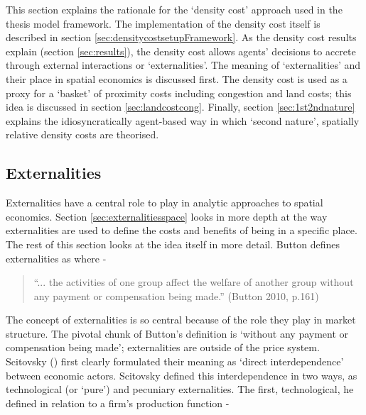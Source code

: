 {This section explains the rationale for the `density cost' approach used in the thesis model framework. The implementation of the density cost itself is described in section \ref{sec:densitycostsetupFramework}. As the density cost results explain (section \ref{sec:results}), the density cost allows agents' decisions to accrete through external interactions or `externalities'. The meaning of `externalities' and their place in spatial economics is discussed first. The density cost is used as a proxy for a `basket' of proximity costs including congestion and land costs; this idea is discussed in section \ref{sec:landcostcong}. Finally, section \ref{sec:1st2ndnature} explains the idiosyncratically agent-based way in which `second nature', spatially relative density costs are theorised.

\subsection{Externalities \label{sec:externalities}}

Externalities have a central role to play in analytic approaches to spatial economics. Section \ref{sec:externalitiesspace} looks in more depth at the way externalities are used to define the costs and benefits of being in a specific place. The rest of this section looks at the idea itself in more detail. Button defines externalities as where - 

\begin{quote}
``... the activities of one group affect the welfare of another group without any payment or compensation being made.'' (Button 2010, p.161) 
\end{quote}

The concept of externalities is so central because of the role they play in market structure. The pivotal chunk of Button's definition is `without any payment or compensation being made'; externalities are outside of the price system. Scitovsky (\citeyear{scitovsky_two_1954}) first clearly formulated their meaning as `direct interdependence' between economic actors. Scitovsky defined this interdependence in two ways, as technological (or `pure') and pecuniary externalities. The first, technological, he defined in relation to a firm's production function -

}
